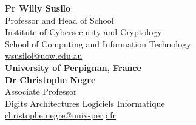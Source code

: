 \documentclass[a4paper,12pt,final]{memoir}
\newcommand{\CVItem}[1]
{\textbf{\color{RoyalBlue} #1}}
\begin{document}
\textbf{Pr Willy Susilo} \\
Professor and Head of School\\
Institute of Cybersecurity and Cryptology \\
School of Computing and Information Technology \\
\url{wsusilol@uow.edu.au} \\

\CVItem{University of Perpignan, France} \\
\textbf{Dr Christophe Negre} \\
Associate Professor \\
Digits Architectures Logiciels Informatique\\
\url{christophe.negre@univ-perp.fr} 


\end{document}
